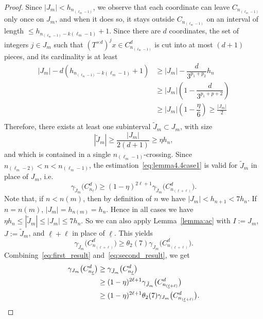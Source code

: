 \documentclass[10pt]{amsart}
\theoremstyle{definition}\newtheorem{defi}[theo]{Definition}\newtheorem{rema}[theo]{Remark}\newtheorem{exam}[theo]{Example}\newtheorem{exem}[theo]{Example}\newtheorem{nota}[theo]{Notation}
\newcommand{\egdef}{:=}
\newcommand{\cd}{C^{d}}
\newcommand{\td}{T^{\times d}}
\newcommand{\lb}{\underline{\ell}}
\newcommand{\Gam}[1]{\gamma_{#1}\bigl(\cd_{n_{\lb}}\bigr)}
\begin{document}
\begin{proof}
Since $|J_m|< h_ {n_{(\ell_m-1)}}$, we observe that each coordinate can leave $C_{n_{(\ell_m-1)}}$ only once on $J_m$, and when it does so, it stays outside $C_{n_{(\ell_m-1)}}$ on an interval of length $\le h_{n_{(\ell_m-1)}-k(\ell_m-1)}+1$. Since there are $d$ coordinates, the set of integers $j\in J_m$ such that $(\td)^jx\in \cd_{n_{(\ell_m-1)}}$ is cut into at most $(d+1)$ pieces, and its cardinality is at least
\begin{align*}
|J_m| - d\left(h_{n_{(\ell_m-1)}-k(\ell_m-1)}+1 \right) & \ge |J_m| - \dfrac{d}{3^{p_1+p_2}} h_{n} \\
& \ge |J_m|\left(1-\dfrac{d}{3^{p_1+p+2}}\right)\\
& \ge |J_m|\left(1-\dfrac{\eta}{6}\right) \ge \frac{|J_m|}{2}\\
\end{align*}
Therefore, there exists at least one subinterval $\tilde J_m\subset J_m$, with size
\[
|\tilde J_m| \ge \frac{|J_m|}{2(d+1)}\ge \eta h_{n},
\]
and which is contained in a single $n_{(\ell_m-1)}$-crossing. Since $n_{(\ell_m-2)}<n<n_{(\ell_m-1)}$, the estimation~\eqref{eq:lemma4.4case1} is valid for $\tilde J_m$ in place of $J_m$, i.e.
\begin{equation}\label{eq:first_result}
\gamma_{\tilde J_m}\bigl(\cd_{n_{\lb}}\bigr) \ge (1-\eta)^{2\ell+1} \gamma_{\tilde J_m} \bigl(\cd_{n_{(\lb+\ell)}}\bigr).
\end{equation}
Note that, if $n<n(m)$, then by definition of $n$ we have $|J_m|<h_{n+1}<7 h_n$. If $n=n(m)$, $|J_m|=h_{n(m)}=h_n$. Hence in all cases we have $\eta h_{n}\le |\tilde J_m| \le |J_m| \le 7 h_n$. So we can also apply Lemma~\ref{lemma:ac} with $I\egdef J_m$, $J\egdef \tilde J_m$, and $\lb+\ell$ in place of $\lb$. This yields
\begin{equation}\label{eq:second_result}
\gamma_{\tilde J_m} \bigl(\cd_{n_{(\lb+\ell)}}\bigr)\ge \theta_2(7) \gamma_{J_m} \bigl(\cd_{n_{(\lb+\ell)}}\bigr).
\end{equation}
Combining~\eqref{eq:first_result} and~\eqref{eq:second_result}, we get
\begin{align*}
\Gam{J_m} &\ge \gamma_{\tilde J_m}\bigl(\cd_{n_{\lb}}\bigr) \\
&\ge (1-\eta)^{2\ell+1} \gamma_{\tilde J_m} \bigl(\cd_{n_{(\lb+\ell)}}\bigr)\\
&\ge (1-\eta)^{2\ell+1} \theta_2(7) \gamma_{J_m} \bigl(\cd_{n_{(\lb+\ell)}}\bigr).\qedhere
\end{align*}
\end{proof}
\end{document}
